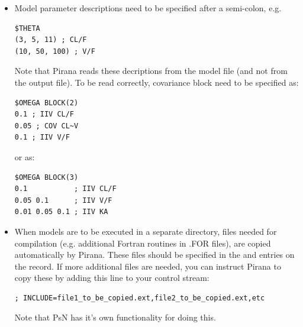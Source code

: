 {{{{\begin{itemize}
\begin{lstlisting}
;; 1. Based on: 001.mod
; Ref. model:001.mod
; Ref:001.mod
; Parent=001.mod
\end{lstlisting}

\item Model parameter descriptions need to be specified
after a semi-colon, e.g.

\begin{lstlisting}
$THETA
(3, 5, 11) ; CL/F
(10, 50, 100) ; V/F
\end{lstlisting}

Note that Pirana reads these decriptions from the model file (and
not from the output file). To be read correctly, covariance block need
to be specified as:

\begin{lstlisting}
$OMEGA BLOCK(2)
0.1 ; IIV CL/F
0.05 ; COV CL~V
0.1 ; IIV V/F
\end{lstlisting}

or as:

\begin{lstlisting}
$OMEGA BLOCK(3)
0.1           ; IIV CL/F
0.05 0.1      ; IIV V/F
0.01 0.05 0.1 ; IIV KA
\end{lstlisting}

\item When models are to be executed in a separate directory, files
  needed for compilation (e.g. additional Fortran routines in .FOR
  files), are copied automatically by Pirana. These files should be
  specified in the  \normalfont and 
  \normalfont entries on the  \normalfont record. If
  more additional files are needed, you can instruct Pirana to copy
  these by adding this line to your control stream:

\begin{lstlisting}
; INCLUDE=file1_to_be_copied.ext,file2_to_be_copied.ext,etc
\end{lstlisting}

Note that PsN has it's own functionality for doing this.

\end{itemize}

}}}}
